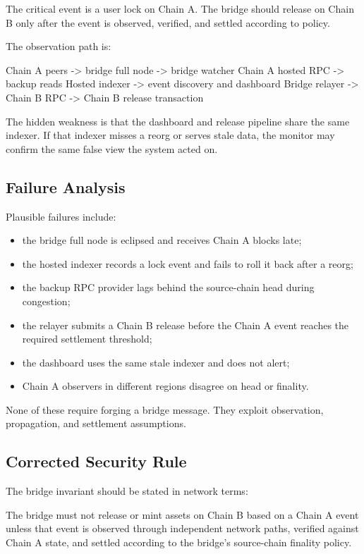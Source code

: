 The critical event is a user lock on Chain A. The bridge should release on Chain B only after the event is observed, verified, and settled according to policy.

The observation path is:

\begin{codeblock}
Chain A peers -> bridge full node -> bridge watcher
Chain A hosted RPC -> backup reads
Hosted indexer -> event discovery and dashboard
Bridge relayer -> Chain B RPC -> Chain B release transaction
\end{codeblock}

The hidden weakness is that the dashboard and release pipeline share the same indexer. If that indexer misses a reorg or serves stale data, the monitor may confirm the same false view the system acted on.

\subsection{Failure Analysis}

Plausible failures include:

\begin{itemize}
\item the bridge full node is eclipsed and receives Chain A blocks late;
\item the hosted indexer records a lock event and fails to roll it back after a reorg;
\item the backup RPC provider lags behind the source-chain head during congestion;
\item the relayer submits a Chain B release before the Chain A event reaches the required settlement threshold;
\item the dashboard uses the same stale indexer and does not alert;
\item Chain A observers in different regions disagree on head or finality.
\end{itemize}

None of these require forging a bridge message. They exploit observation, propagation, and settlement assumptions.

\subsection{Corrected Security Rule}

The bridge invariant should be stated in network terms:

\begin{codeblock}
The bridge must not release or mint assets on Chain B based on a Chain A
event unless that event is observed through independent network paths,
verified against Chain A state, and settled according to the bridge's
source-chain finality policy.
\end{codeblock}

